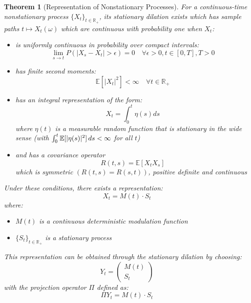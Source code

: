 \documentclass{article}
\newtheorem{theorem}{Theorem}
\begin{document}
\begin{theorem}[Representation of Nonstationary Processes]
  For a continuous-time nonstationary process $\{X_t \}_{t \in \mathbb{R}_+}$,
  its stationary dilation exists which has sample paths $t \mapsto X_t
  (\omega)$ which are continuous with probability one when $X_t$:
  \begin{itemize}
    \item is uniformly continuous in probability over compact intervals:
    \begin{equation}
      \lim_{s \to t} P (|X_s - X_t | > \epsilon) = 0 \quad \forall \epsilon >
      0, t \in [0, T], T > 0
    \end{equation}
    \item has finite second moments:
    \begin{equation}
      \mathbb{E} [|X_t |^2] < \infty \quad \forall t \in \mathbb{R}_+
    \end{equation}
    \item has an integral representation of the form:
    \begin{equation}
      X_t = \int_0^t \eta (s) ds
    \end{equation}
    where $\eta (t)$ is a measurable random function that is stationary in the
    wide sense (with $\int_0^t \mathbb{E} [| \eta (s) |^2]  \hspace{0.17em} ds
    < \infty$ for all $t$)
    
    \item and has a covariance operator
    \begin{equation}
      R (t, s) =\mathbb{E} [X_t X_s]
    \end{equation}
    which is symmetric $(R (t, s) = R (s, t))$, positive definite and
    continuous
  \end{itemize}
  Under these conditions, there exists a representation:
  \begin{equation}
    X_t = M (t) \cdot S_t
  \end{equation}
  where:
  \begin{itemize}
    \item $M (t)$ is a continuous deterministic modulation function
    
    \item $\{S_t \}_{t \in \mathbb{R}_+}$ is a stationary process
  \end{itemize}
  This representation can be obtained through the stationary dilation by
  choosing:
  \begin{equation}
    Y_t = \left( \begin{array}{c}
      M (t)\\
      S_t
    \end{array} \right)
  \end{equation}
  with the projection operator $\Pi$ defined as:
  \begin{equation}
    \Pi Y_t = M (t) \cdot S_t
  \end{equation}
\end{theorem}
\end{document}

